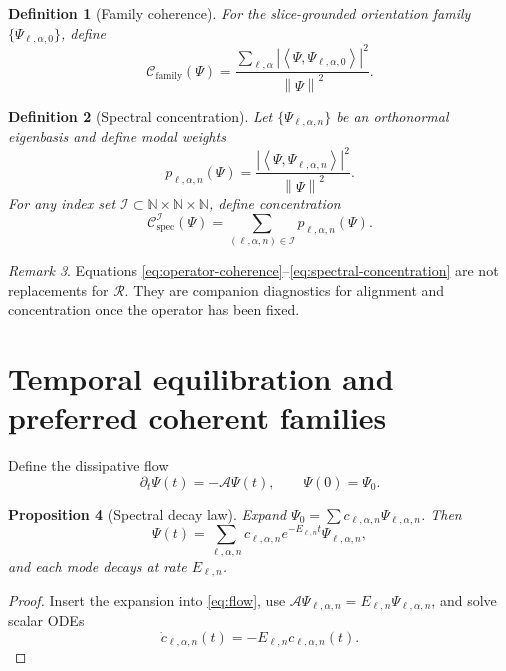 \documentclass[11pt]{article}
\newtheorem{definition}{Definition}[section]
\newtheorem{proposition}[definition]{Proposition}
\theoremstyle{remark}
\newtheorem{remark}[definition]{Remark}
\newcommand{\N}{\mathbb{N}}
\newcommand{\ip}[2]{\left\langle #1, #2 \right\rangle}
\newcommand{\norm}[1]{\left\lVert #1 \right\rVert}
\newcommand{\Aop}{\mathcal{A}}
\newcommand{\Res}{\mathcal{R}}
\newcommand{\CFamily}{\mathcal{C}_{\mathrm{family}}}
\newcommand{\CSpec}{\mathcal{C}_{\mathrm{spec}}}
\begin{document}
\begin{definition}[Family coherence]
For the slice-grounded orientation family $\{\Psi_{\ell,\alpha,0}\}$, define
\begin{equation}
\CFamily(\Psi)
=
\frac{\sum_{\ell,\alpha} |\ip{\Psi}{\Psi_{\ell,\alpha,0}}|^2}{\norm{\Psi}^2}.
\label{eq:family-coherence}
\end{equation}
\end{definition}

\begin{definition}[Spectral concentration]
Let $\{\Psi_{\ell,\alpha,n}\}$ be an orthonormal eigenbasis and define modal weights
\[
p_{\ell,\alpha,n}(\Psi)=\frac{|\ip{\Psi}{\Psi_{\ell,\alpha,n}}|^2}{\norm{\Psi}^2}.
\]
For any index set $\mathcal{I}\subset\N\times\N\times\N$, define concentration
\begin{equation}
\CSpec^{\mathcal{I}}(\Psi)=\sum_{(\ell,\alpha,n)\in\mathcal{I}} p_{\ell,\alpha,n}(\Psi).
\label{eq:spectral-concentration}
\end{equation}
\end{definition}

\begin{remark}
Equations \eqref{eq:operator-coherence}--\eqref{eq:spectral-concentration} are not replacements for $\Res$. They are companion diagnostics for alignment and concentration once the operator has been fixed.
\end{remark}

\section{Temporal equilibration and preferred coherent families}

Define the dissipative flow
\begin{equation}
\partial_t\Psi(t)=-\Aop\Psi(t),
\qquad
\Psi(0)=\Psi_0.
\label{eq:flow}
\end{equation}

\begin{proposition}[Spectral decay law]
Expand $\Psi_0=\sum c_{\ell,\alpha,n}\Psi_{\ell,\alpha,n}$. Then
\begin{equation}
\Psi(t)=\sum_{\ell,\alpha,n} c_{\ell,\alpha,n}e^{-E_{\ell,n}t}\Psi_{\ell,\alpha,n},
\label{eq:flow-spectral}
\end{equation}
and each mode decays at rate $E_{\ell,n}$.
\end{proposition}

\begin{proof}
Insert the expansion into \eqref{eq:flow}, use $\Aop\Psi_{\ell,\alpha,n}=E_{\ell,n}\Psi_{\ell,\alpha,n}$, and solve scalar ODEs
\[
\dot c_{\ell,\alpha,n}(t)=-E_{\ell,n}c_{\ell,\alpha,n}(t).
\]
\end{proof}
\end{document}
